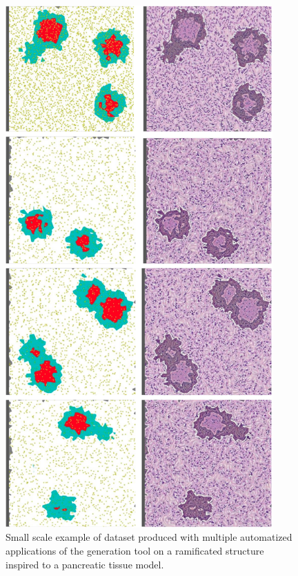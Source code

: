     \begin{figure}
        \centering
        \includegraphics[height=20cm,keepaspectratio]{images/dataset}
        \caption{Small scale example of dataset produced with multiple automatized applications of the generation tool on a ramificated structure inspired to a pancreatic tissue model.}
        \label{fig:dataset}
    \end{figure}
